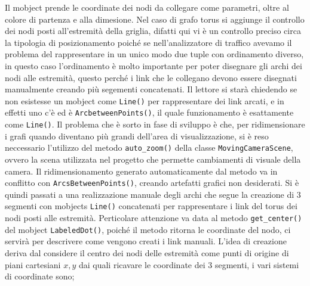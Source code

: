 \documentclass[binding=0.6cm]{sapthesis}
\begin{document}
Il mobject prende le coordinate dei nodi da collegare come parametri, oltre al colore di partenza e alla dimesione.
Nel caso di grafo torus si aggiunge il controllo dei nodi posti all'estremità della griglia, difatti qui vi è un controllo preciso circa la tipologia di posizionamento poiché se nell'analizzatore di traffico
avevamo il problema del rappresentare in un unico modo due tuple con ordinamento diverso, 
in questo caso l'ordinamento è molto importante per poter disegnare gli archi dei nodi alle estremità, questo perché i link che le collegano devono essere disegnati manualmente creando più segementi concatenati.
Il lettore si starà chiedendo se non esistesse un mobject come \lstinline|Line()| per rappresentare dei link arcati, e in effetti uno c'è ed è \lstinline|ArcbetweenPoints()|, il quale funzionamento è esattamente come \lstinline|Line()|.
Il problema che è sorto in fase di sviluppo è che, per ridimensionare i grafi quando diventano più grandi dell'area di visualizzazione, si è reso neccessario l'utilizzo del metodo
 \lstinline|auto_zoom()| della classe \lstinline|MovingCameraScene|, ovvero la scena utilizzata nel progetto che permette cambiamenti di visuale della camera.
Il ridimensionamento generato automaticamente dal metodo va in conflitto con \lstinline|ArcsBetweenPoints()|, creando artefatti grafici non desiderati.
Si è quindi passati a una realizzazione manuale degli archi che segue la creazione di 3 segmenti con mobjects \lstinline|Line()| concatenati per rappresentare i link del torus dei nodi posti alle estremità.
Perticolare attenzione va data al metodo \lstinline|get_center()| del mobject \lstinline|LabeledDot()|, poiché il metodo ritorna le coordinate del nodo, ci servirà per descrivere come vengono creati i link manuali.
L'idea di creazione deriva dal considere il centro dei nodi delle estremità come punti di origine di piani cartesiani \(x, y\) dai quali ricavare le coordinate dei 3 segmenti, i vari sistemi di coordinate sono;
\end{document}
